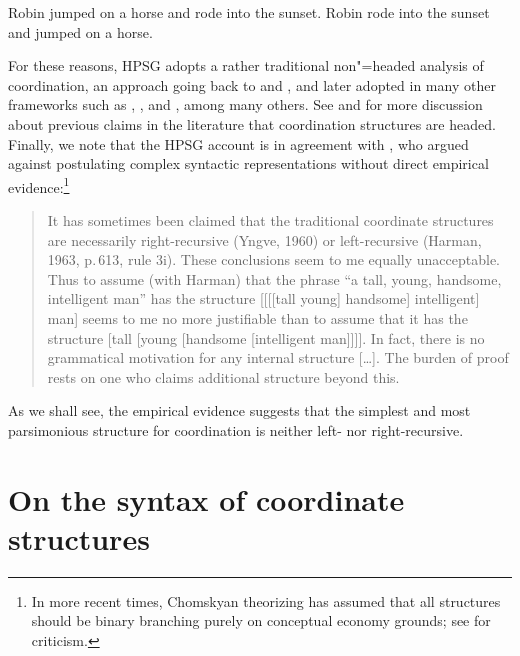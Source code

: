 {\begin{exe}
\ex
\begin{xlista}
\ex Robin jumped on a horse and rode into the sunset.
\ex Robin rode into the sunset and jumped on a horse.
\end{xlista}
\end{exe}

For these reasons, HPSG adopts a rather traditional non"=headed analysis of coordination, an approach  going back
to \citet[195]{bloom} and  \citet{ross67}, and later adopted in many other frameworks such as \citet{pesetsky}, \citet{gazdarc}, and \citet[1275]{rodney}, among many others. 
See \citet{borsley94,Borsley2005a} 
and 
\citet[Chapter~2]{chavesthesis} for more discussion about previous claims in the literature that coordination structures are headed.
Finally, we note that the HPSG account is in agreement with \citet[196]{chom65}, who argued against postulating complex syntactic representations without direct empirical evidence:\footnote{In more recent times, Chomskyan theorizing has assumed that all structures should be binary branching purely on conceptual economy grounds; see \citet{Johnson:Lappin:99} for criticism.}

\begin{quote}
It has sometimes been claimed that the traditional coordinate structures are necessarily right-recursive (Yngve, 1960) or left-recursive (Harman, 1963, p.\,613, rule 3i). These conclusions seem to me equally unacceptable. Thus to assume (with Harman) that the phrase “a tall, young, handsome, intelligent man” has the structure [[[[tall young] handsome] intelligent] man] seems to me no more justifiable than to assume that it has
the structure [tall [young [handsome [intelligent man]]]]. In fact, there is no grammatical
motivation for any internal structure [\ldots]. The burden of proof rests on one who claims additional
structure beyond this. \citep[196--197]{chom65}
\end{quote}

\noindent
As we shall see, the empirical evidence suggests that
the simplest and most parsimonious structure for coordination is neither left- nor right-recursive.


\section{On the syntax of coordinate structures}

}
